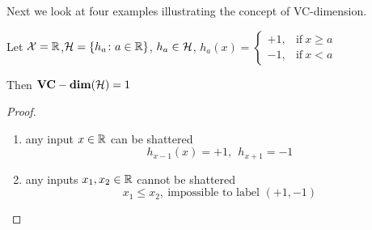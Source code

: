 Next we look at four examples illustrating the concept of VC-dimension. 

\begin{eg}
    Let \(\mathcal{X} = \mathbb{R}\),\(\mathcal{H} = \{h_a \colon a\in \mathbb{R}\}\),
     \(h_a \in \mathcal{H}\), \(h_a (x) = \begin{cases}
        +1, &\text{if} \ x \geq a \\ 
        -1, &\text{if} \ x < a 
    \end{cases}\)

     \begin{center}
        Then \(\mathbf{VC-dim}(\mathcal{H}) = 1\)
     \end{center} 
\end{eg}

\begin{proof}
    \begin{enumerate}
        \item any input \(x \in \mathbb{R}\) can be shattered 
        \[
            h_{x-1}(x) = +1, \ \ h_{x+1} = -1 
        \]
        \item any inputs \(x_1, x_2 \in \mathbb{R}\) cannot be shattered 
        \[
            x_1 \leq x_2, \ \text{impossible to label } (+1, -1)  
        \]
    \end{enumerate}
\end{proof}

\begin{eg}
    
\end{eg}